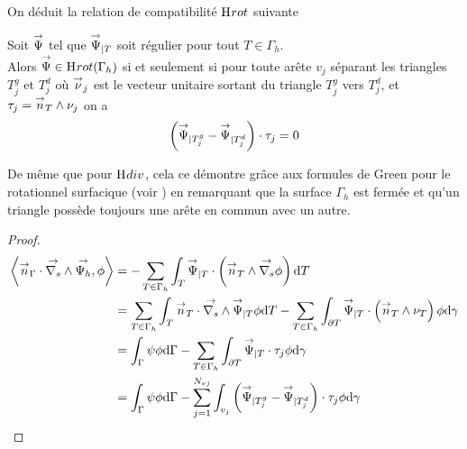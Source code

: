 On déduit la relation de compatibilité \(\mathrm{H}_\mathrm{{}}{rot}\) suivante
\begin{prop}
    \label{prop:annex:hdiv_hrot:hrot}
    Soit \({\overset{\rightarrow}{\Psi}}\) tel que \({\overset{\rightarrow}{\Psi}}_{|T}\) soit régulier pour tout \(T\in\Gamma_h\).\\
    Alors \({\overset{\rightarrow}{\Psi}} \in \mathrm{H}_\mathrm{{}}{rot}(\Gamma_h)\) si et seulement si pour toute arête \(v_j\) séparant les triangles \(T_j^g\) et \(T_j^d\) où \({\overset{\rightarrow}{\nu}}_j\) est le vecteur unitaire sortant du triangle \(T_j^g\) vers \(T_j^d\), et \(\tau_j = {\overset{\rightarrow}{n}}_T \wedge \nu_j\) on a
    \begin{equation}
        \left({\overset{\rightarrow}{\Psi}}_{|T_j^g} - {\overset{\rightarrow}{\Psi}}_{|T_j^d} \right) \cdot \tau_j = 0
    \end{equation}
\end{prop}

De même que pour \(\mathrm{H}_\mathrm{{}}{div}\), cela ce démontre grâce aux formules de Green pour le rotationnel surfacique (voir \cite[eq.~(A3.57)]{bladel_electromagnetic_2007}) en remarquant que la surface \(\Gamma_h\) est fermée et qu'un triangle possède toujours une arête en commun avec un autre.

\begin{proof}
    \begin{align}
    \left< {\overset{\rightarrow}{n}}_\Gamma \cdot {\overset{\rightarrow}{\nabla_s}} \wedge {\overset{\rightarrow}{\Psi_h}}, \phi \right>
    & = - \sum_{T\in\Gamma_h} \int_T {\overset{\rightarrow}{\Psi}}_{|T}  \cdot \left( {\overset{\rightarrow}{n}}_T \wedge {\overset{\rightarrow}{\nabla_s}} \phi \right) \mathrm{d}{T} \\
    & = \sum_{T\in\Gamma_h} \int_T {\overset{\rightarrow}{n}}_T \cdot {\overset{\rightarrow}{\nabla_s}} \wedge {\overset{\rightarrow}{\Psi}}_{|T} \phi \mathrm{d}{T} - \sum_{T\in\Gamma_h} \int_{\partial T}  {\overset{\rightarrow}{\Psi}}_{|T} \cdot \left({\overset{\rightarrow}{n}}_T \wedge \nu_T \right)\phi\mathrm{d}{\gamma}\\
    & = \int_\Gamma \psi \phi \mathrm{d}{\Gamma} - \sum_{T\in\Gamma_h} \int_{\partial T}  {\overset{\rightarrow}{\Psi}}_{|T} \cdot \tau_j \phi\mathrm{d}{\gamma}\\
    &= \int_\Gamma \psi \phi \mathrm{d}{\Gamma} - \sum_{j=1}^{N_{vj}} \int_{v_j}  \left({\overset{\rightarrow}{\Psi}}_{|T_j^g} - {\overset{\rightarrow}{\Psi}}_{|T_j^d} \right) \cdot \tau_j \phi\mathrm{d}{\gamma}
    \end{align}
\end{proof}